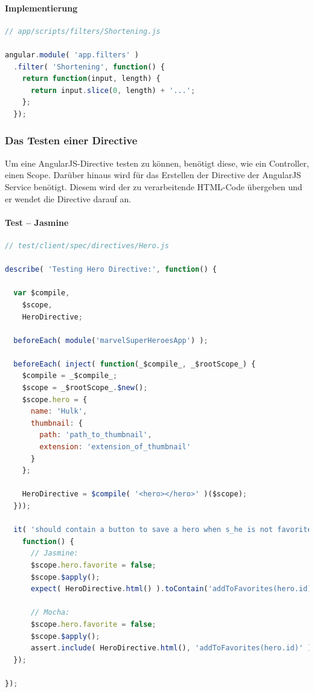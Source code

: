 \paragraph{Implementierung}
\begin{lstlisting}[language=JavaScript, caption=TDD AngularJS - Filters - Implementation]
// app/scripts/filters/Shortening.js

angular.module( 'app.filters' )
  .filter( 'Shortening', function() {
    return function(input, length) {
      return input.slice(0, length) + '...';
    };
  });
\end{lstlisting}

\subsubsection{Das Testen einer Directive}
Um eine AngularJS-Directive testen zu können, benötigt diese, wie ein Controller, einen Scope. Darüber hinaus wird für das Erstellen der Directive der AngularJS Service  benötigt. Diesem wird der zu verarbeitende HTML-Code übergeben und er wendet die Directive darauf an.

\paragraph{Test -- Jasmine}
\begin{lstlisting}[language=JavaScript, caption=TDD AngularJS - Directives]
// test/client/spec/directives/Hero.js

describe( 'Testing Hero Directive:', function() {

  var $compile,
    $scope,
    HeroDirective;

  beforeEach( module('marvelSuperHeroesApp') );

  beforeEach( inject( function(_$compile_, _$rootScope_) {
    $compile = _$compile_;
    $scope = _$rootScope_.$new();
    $scope.hero = {
      name: 'Hulk',
      thumbnail: {
        path: 'path_to_thumbnail',
        extension: 'extension_of_thumbnail'
      }
    };

    HeroDirective = $compile( '<hero></hero>' )($scope);
  }));

  it( 'should contain a button to save a hero when s_he is not favorite', 
    function() {
      // Jasmine:
      $scope.hero.favorite = false;
      $scope.$apply();
      expect( HeroDirective.html() ).toContain('addToFavorites(hero.id)');

      // Mocha:
      $scope.hero.favorite = false;
      $scope.$apply();
      assert.include( HeroDirective.html(), 'addToFavorites(hero.id)' );
  });

});

\end{lstlisting}

